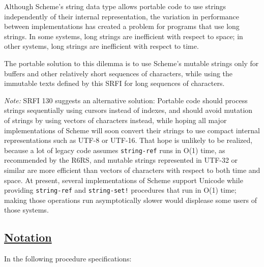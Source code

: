 Although Scheme's string data type allows portable code to use strings
independently of their internal representation, the variation in
performance between implementations has created a problem for programs
that use long strings. In some systems, long strings are inefficient
with respect to space; in other systems, long strings are inefficient
with respect to time.

The portable solution to this dilemma is to use Scheme's mutable strings
only for buffers and other relatively short sequences of characters,
while using the immutable texts defined by this SRFI for long sequences
of characters.

\emph{Note:} SRFI 130 suggests an alternative solution: Portable code
should process strings sequentially using cursors instead of indexes,
and should avoid mutation of strings by using vectors of characters
instead, while hoping all major implementations of Scheme will soon
convert their strings to use compact internal representations such as
UTF-8 or UTF-16. That hope is unlikely to be realized, because a lot of
legacy code assumes \texttt{string-ref} runs in O(1) time, as
recommended by the R6RS, and mutable strings represented in UTF-32 or
similar are more efficient than vectors of characters with respect to
both time and space. At present, several implementations of Scheme
support Unicode while providing \texttt{string-ref} and
\texttt{string-set!} procedures that run in O(1) time; making those
operations run asymptotically slower would displease some users of those
systems.

\subsection{\texorpdfstring{\href{}{Notation}}{Notation}}\label{notation}

In the following procedure specifications:

